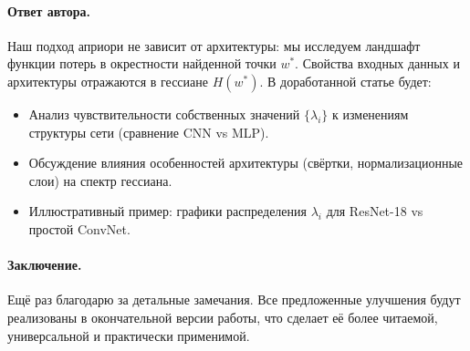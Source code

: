 \documentclass[11pt]{article}
\begin{document}
\paragraph{Ответ автора.}
Наш подход априори не зависит от архитектуры: мы исследуем ландшафт функции потерь в окрестности найденной точки \(w^*\). Свойства входных данных и архитектуры отражаются в гессиане \(H(w^*)\). В доработанной статье будет:
\begin{itemize}
    \item Анализ чувствительности собственных значений \( \{\lambda_i\} \) к изменениям структуры сети (сравнение CNN vs MLP).
    \item Обсуждение влияния особенностей архитектуры (свёртки, нормализационные слои) на спектр гессиана.
    \item Иллюстративный пример: графики распределения \(\lambda_i\) для ResNet-18 vs простой ConvNet.
\end{itemize}

\paragraph{Заключение.}
Ещё раз благодарю за детальные замечания. Все предложенные улучшения будут реализованы в окончательной версии работы, что сделает её более читаемой, универсальной и практически применимой.
\end{document}
